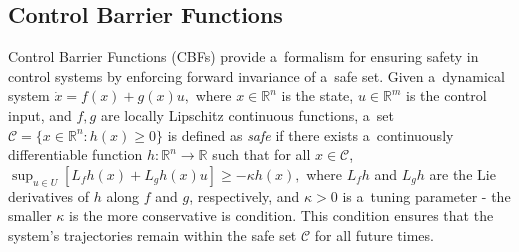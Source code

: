 \documentclass{svproc}
\begin{document}
\subsection{Control Barrier Functions}
Control Barrier Functions (CBFs) provide a~formalism for ensuring safety in
control systems by enforcing forward invariance of a~safe set. Given a~dynamical
system
$
    \dot{x} = f(x) + g(x)u,
$
where $x\in\mathbb{R}^n$ is the state, $u\in\mathbb{R}^m$ is the control input, and
$f,g$ are locally Lipschitz continuous functions, a~set
$
    \mathcal{C} = \{x\in\mathbb{R}^n : h(x) \ge 0\}
$
is defined as \emph{safe} if there exists a~continuously differentiable function
$h:\mathbb{R}^n \to \mathbb{R}$ such that for all $x\in\mathcal{C}$,
$
    \sup_{u\in U} [L_f h(x) + L_g h(x) u] \ge -\kappa h(x),
$
where $L_f h$ and $L_g h$ are the Lie derivatives of $h$ along $f$ and $g$,
respectively, and $\kappa>0$ is a~tuning parameter - the smaller $\kappa$ is
the more conservative is condition. This condition ensures that the system's
trajectories remain within the safe set $\mathcal{C}$ for all future times.

\end{document}
